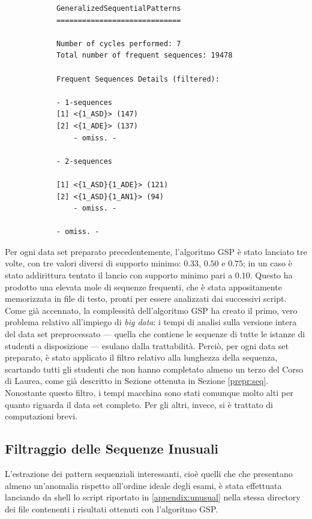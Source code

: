         \begin{lstlisting}
            GeneralizedSequentialPatterns
            =============================

            Number of cycles performed: 7
            Total number of frequent sequences: 19478

            Frequent Sequences Details (filtered):
            
            - 1-sequences
            [1] <{1_ASD}> (147)
            [2] <{1_ADE}> (137)
                - omiss. -

            - 2-sequences

            [1] <{1_ASD}{1_ADE}> (121)
            [2] <{1_ASD}{1_AN1}> (94)
                - omiss. -

            - omiss. -
        \end{lstlisting}

        Per ogni data set preparato precedentemente, l'algoritmo GSP è stato lanciato tre volte, con tre valori diversi di supporto minimo: $0.33$, $0.50$ e $0.75$; in un caso è stato addirittura tentato il lancio con supporto minimo pari a $0.10$. Questo ha prodotto una elevata mole di sequenze frequenti, che è stata appositamente memorizzata in file di testo, pronti per essere analizzati dai successivi script. \\

        Come già accennato, la complessità dell'algoritmo GSP ha creato il primo, vero problema relativo all'impiego di \textit{big data}: i tempi di analisi sulla versione intera del data set preprocessato --- quella che contiene le sequenze di tutte le istanze di studenti a disposizione --- esulano dalla trattabilità. Perciò, per ogni data set preparato, è stato applicato il filtro relativo alla lunghezza della sequenza, scartando tutti gli studenti che non hanno completato almeno un terzo del Corso di Laurea, come già descritto in Sezione ottenuta in Sezione \ref{prepr:seq}. Nonostante questo filtro, i tempi macchina sono stati comunque molto alti per quanto riguarda il data set completo. Per gli altri, invece, si è trattato di computazioni brevi. \\

    \subsection{Filtraggio delle Sequenze Inusuali}

    L'estrazione dei pattern sequenziali interessanti, cioè quelli che che presentano almeno un'anomalia rispetto all'ordine ideale degli esami, è stata effettuata lanciando da shell lo script riportato in \ref{appendix:unusual} nella stessa directory dei file contenenti i risultati ottenuti con l'algoritmo GSP. \\

